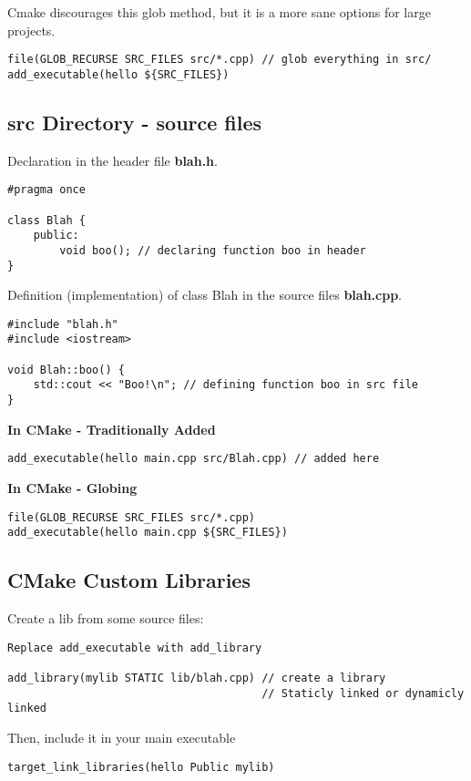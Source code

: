 \documentclass[openany]{report}
\begin{document}
Cmake discourages this glob method, but it is a more sane options for large projects.

\begin{verbatim}
file(GLOB_RECURSE SRC_FILES src/*.cpp) // glob everything in src/
add_executable(hello ${SRC_FILES})
\end{verbatim}

\subsection{src Directory - source files}

Declaration in the header file \textbf{blah.h}.
\begin{verbatim}
#pragma once

class Blah {
    public:
        void boo(); // declaring function boo in header
}
\end{verbatim}

Definition (implementation) of class Blah in the source files \textbf{blah.cpp}.
\begin{verbatim}
#include "blah.h"
#include <iostream>

void Blah::boo() {
    std::cout << "Boo!\n"; // defining function boo in src file
}
\end{verbatim}

\textbf{In CMake - Traditionally Added}
\begin{verbatim}
add_executable(hello main.cpp src/Blah.cpp) // added here
\end{verbatim}

\textbf{In CMake - Globing}
\begin{verbatim}
file(GLOB_RECURSE SRC_FILES src/*.cpp)
add_executable(hello main.cpp ${SRC_FILES})
\end{verbatim}

\subsection{CMake Custom Libraries}

Create a lib from some source files:

\begin{verbatim}
Replace add_executable with add_library

add_library(mylib STATIC lib/blah.cpp) // create a library
                                       // Staticly linked or dynamicly linked
\end{verbatim}

Then, include it in your main executable
\begin{verbatim}
target_link_libraries(hello Public mylib)
\end{verbatim}
\end{document}
